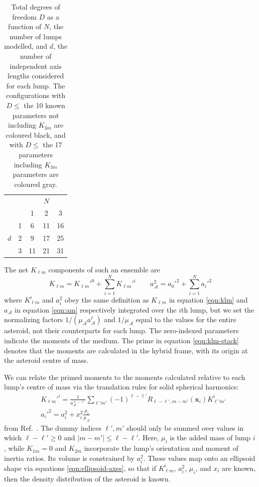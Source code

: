 \documentclass[fleqn,usenatbib]{mnras}
\begin{document}
\begin{table}
  \centering
  \begin{tabular}{cc|ccc}
    \hline \hline
        &  & & $N$ &  \\
        &  & 1  & 2  & 3  \\ \hline 
        & 1& \cellcolor{black}\color{white} 6 & \cellcolor{gray}\color{white} 11 & \cellcolor{gray}\color{white} 16\\
    $d$ & 2& \cellcolor{black}\color{white} 9 & \cellcolor{gray}\color{white} 17 & 25 \\
        & 3& \cellcolor{gray}\color{white}  11 &  21 &  31 \\
    \hline \hline
  \end{tabular}
  \caption{Total degrees of freedom $D$ as a function of $N$, the number of lumps modelled, and $d$, the number of independent axis lengths considered for each lump. The configurations with $D \leq$ the 10 known parameters not including $K_{3m}$ are coloured black, and with $D \leq$ the 17 parameters including $K_{3m}$ parameters are coloured gray.}
  \label{tab:lump-dof}
\end{table}

The net $K_{\ell m}$ components of such an ensemble are
\begin{equation}
  K_{\ell m} = K_{\ell m}'^0 + \sum_{i=1}^N K_{\ell m}'^i \qquad a_\mathcal{A}^2 = a_0'^2 + \sum_{i=1}^N a_i'^2
  \label{eqn:klm-stack}
\end{equation}
where $K_{\ell m}^i$ and $a_i^2$ obey the same definition as $K_{\ell m}$ in equation \ref{eqn:klm} and $a_\mathcal{A}$ in equation \ref{eqn:am} respectively integrated over the $i$th lump, but we set the normalizing factors $1/(\mu_\mathcal{A} a_\mathcal{A}^\ell)$ and $1/\mu_\mathcal{A}$ equal to the values for the entire asteroid, not their counterparts for each lump. The zero-indexed parameters indicate the moments of the medium. The prime in equation \ref{eqn:klm-stack} denotes that the moments are calculated in the hybrid frame, with its origin at the asteroid centre of mass.

We can relate the primed moments to the moments calculated relative to each lump's centre of mass via the translation rules for solid spherical harmonics:
\begin{equation}
  \begin{split}
  & K_{\ell m}'^i = \frac{1}{a_\mathcal{A}^{\ell - \ell'}}\sum_{\ell' m'} (-1)^{\ell - \ell'} R_{\ell - \ell', m - m'}(\bm x_i) K_{\ell' m'}^i\\
  & a_i'^2 = a_i^2 + x_i^2 \frac{\mu_i}{\mu_\mathcal{A}}
  \end{split}
  \label{eqn:translate-klm}
\end{equation}
from Ref.~\cite{Gelderen1998TheSO}. The dummy indices $\ell', m'$ should only be summed over values in which $\ell-\ell' \geq 0$ and $|m-m'| \leq \ell - \ell'$. Here, $\mu_i$ is the added mass of lump $i$, while $K_{1m}=0$ and $K_{2m}$ incorporate the lump's orientation and moment of inertia ratios. Its volume is constrained by $a_i^2$. These values map onto an ellipsoid shape via equations \ref{eqn:ellipsoid-axes}, so that if $K_{\ell m}^i$, $a_i^2$, $\mu_i$, and $x_i$ are known, then the density distribution of the asteroid is known.
\end{document}
